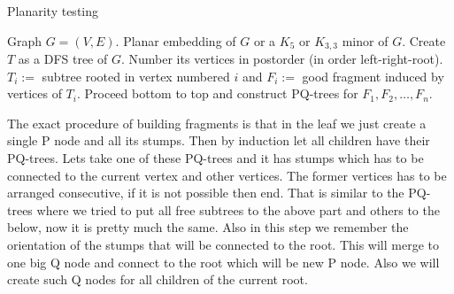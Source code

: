 \begin{algorithm}[!ht]
	\caption{Planarity testing}
	\begin{algorithmic}[1]
			\Require Graph $G = (V,E)$.
			\Ensure Planar embedding of $G$ or a $K_{5}$ or $K_{3,3}$ minor of $G$.
			\State Create $T$ as a DFS tree of $G$.
			\State Number its vertices in postorder (in order left-right-root).
			\State $T_{i}:=$ subtree rooted in vertex numbered $i$ and $F_{i} :=$ good fragment induced by vertices of $T_{i}$.
			\State Proceed bottom to top and construct PQ-trees for $F_{1}, F_{2}, \dots, F_{n}$.
 	\end{algorithmic}
\end{algorithm}

The exact procedure of building fragments is that in the leaf we just create a single P node and all its stumps. Then by induction let all children have their PQ-trees. Lets take one of these PQ-trees and it has stumps which has to be connected to the current vertex and other vertices. The former vertices has to be arranged consecutive, if it is not possible then end. That is similar to the PQ-trees where we tried to put all free subtrees to the above part and others to the below, now it is pretty much the same. Also in this step we remember the orientation of the stumps that will be connected to the root. This will merge to one big Q node and connect to the root which will be new P node. Also we will create such Q nodes for all children of the current root.
